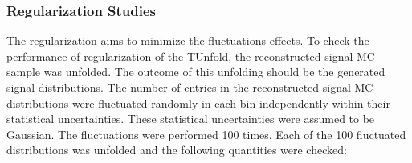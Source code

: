 \subsubsection{Regularization Studies}

The regularization aims to minimize the fluctuations effects. To check the performance of regularization of the TUnfold, the reconstructed signal
MC sample was unfolded. The outcome of this unfolding should be the generated signal distributions. The number of entries in the reconstructed signal
MC distributions were fluctuated randomly in each bin independently within their statistical uncertainties. These statistical uncertainties were assumed
to be Gaussian. The fluctuations were performed 100 times. Each of the 100 fluctuated distributions was unfolded and the following quantities were checked:

